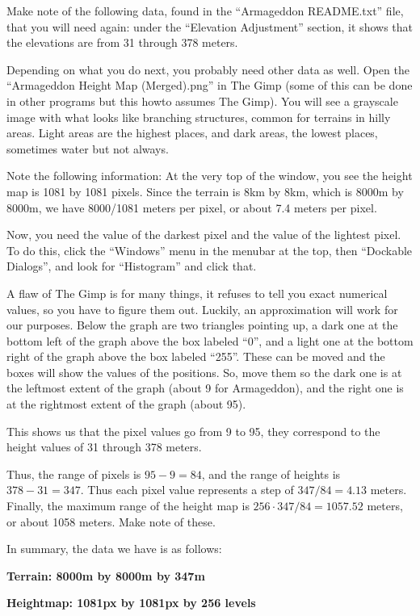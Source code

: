 \documentclass[letter,12pt]{article}
\begin{document}
Make note of the following data, found in the “Armageddon README.txt” file, that you will need again:  under the “Elevation Adjustment” section, it shows that the elevations are from 31 through 378 meters.

Depending on what you do next, you probably need other data as well.  Open the “Armageddon Height Map (Merged).png” in The Gimp (some of this can be done in other programs but this howto assumes The Gimp).  You will see a grayscale image with what looks like branching structures, common for terrains in hilly areas.  Light areas are the highest places, and dark areas, the lowest places, sometimes water but not always.

Note the following information: At the very top of the window, you see the height map is 1081 by 1081 pixels.   Since the terrain is 8km by 8km, which is 8000m by 8000m, we have 8000/1081 meters per pixel, or about 7.4 meters per pixel.

Now, you need the value of the darkest pixel and the value of the lightest pixel.  To do this, click the “Windows” menu in the menubar at the top, then “Dockable Dialogs”, and look for “Histogram” and click that.

A flaw of The Gimp is for many things, it refuses to tell you exact numerical values, so you have to figure them out.  Luckily, an approximation will work for our purposes.  Below the graph are two triangles pointing up, a dark one at the bottom left of the graph above the box labeled “0”, and a light one at the bottom right of the graph above the box labeled “255”.  These can be moved and the boxes will show the values of the positions.  So, move them so the dark one is at the leftmost extent of the graph (about 9 for Armageddon), and the right one is at the rightmost extent of the graph (about 95).

This shows us that the pixel values go from 9 to 95, they correspond to the height values of 31 through 378 meters.

Thus, the range of pixels is $95 - 9 = 84$, and the range of heights is $378 - 31 = 347$.  Thus each pixel value represents a step of $347/84 = 4.13$ meters.  Finally, the maximum range of the height map is $256\cdot347/84=1057.52$ meters, or about 1058 meters.  Make note of these.

In summary, the data we have is as follows:

\textbf{Terrain: 8000m by 8000m by 347m}

\textbf{Heightmap: 1081px  by 1081px by 256 levels}
\end{document}
